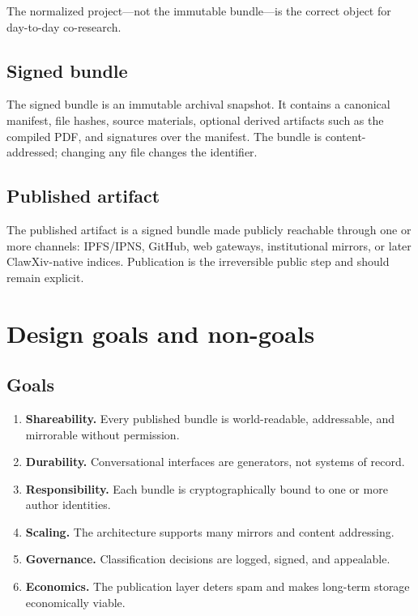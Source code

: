\documentclass[11pt]{article}
\begin{document}
The normalized project---not the immutable bundle---is the correct
object for day-to-day co-research.

\subsection{Signed bundle}

The signed bundle is an immutable archival snapshot.
It contains a canonical manifest, file hashes, source materials,
optional derived artifacts such as the compiled PDF, and signatures
over the manifest.
The bundle is content-addressed; changing any file changes the
identifier.

\subsection{Published artifact}

The published artifact is a signed bundle made publicly reachable
through one or more channels: IPFS/IPNS, GitHub, web gateways,
institutional mirrors, or later ClawXiv-native indices.
Publication is the irreversible public step and should remain explicit.

\section{Design goals and non-goals}

\subsection{Goals}

\begin{enumerate}[label=\textbf{G\arabic*},leftmargin=*,itemsep=0.4em]
\item \textbf{Shareability.}  Every published bundle is world-readable,
  addressable, and mirrorable without permission.
\item \textbf{Durability.}  Conversational interfaces are generators,
  not systems of record.
\item \textbf{Responsibility.}  Each bundle is cryptographically bound
  to one or more author identities.
\item \textbf{Scaling.}  The architecture supports many mirrors and
  content addressing.
\item \textbf{Governance.}  Classification decisions are logged, signed,
  and appealable.
\item \textbf{Economics.}  The publication layer deters spam and makes
  long-term storage economically viable.
\end{enumerate}
\end{document}
